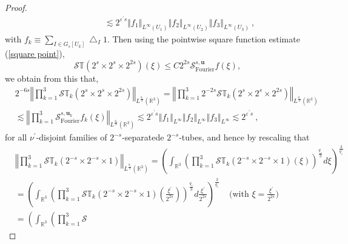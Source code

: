 \documentclass{amsart}%
\theoremstyle{plain}
\numberwithin{equation}{section}
\begin{document}
\begin{proof}
\begin{align*}
&  \ \ \ \ \ \ \ \ \ \ \ \ \ \ \ \ \ \ \ \ \lesssim2^{\varepsilon^{\prime}%
s}\left\Vert f_{1}\right\Vert _{L^{\infty}\left(  U_{1}\right)  }\left\Vert
f_{2}\right\Vert _{L^{\infty}\left(  U_{2}\right)  }\left\Vert f_{3}%
\right\Vert _{L^{\infty}\left(  U_{3}\right)  }\ ,
\end{align*}
with $f_{k}\equiv\sum_{I\in G_{s}\left[  U_{k}\right]  }\bigtriangleup_{I}1$.
Then using the pointwise square function estimate (\ref{square point}),
\[
\mathcal{S}\mathbb{T}\left(  2^{s}\times2^{s}\times2^{2s}\right)  \left(
\xi\right)  \leq C2^{2s}\mathcal{S}_{\operatorname*{Fourier}}^{s,\mathbf{u}%
}f\left(  \xi\right)  ,
\]
we obtain from this that,%
\begin{align*}
&  2^{-6s}\left\Vert \prod_{k=1}^{3}\mathcal{S}\mathbb{T}_{k}\left(
2^{s}\times2^{s}\times2^{2s}\right)  \right\Vert _{L^{\frac{q_{\varepsilon}%
}{3}}\left(  \mathbb{R}^{3}\right)  }=\left\Vert \prod_{k=1}^{3}%
2^{-2s}\mathcal{S}\mathbb{T}_{k}\left(  2^{s}\times2^{s}\times2^{2s}\right)
\right\Vert _{L^{\frac{q_{\varepsilon}}{3}}\left(  \mathbb{R}^{3}\right)  }\\
&  \lesssim\left\Vert \prod_{k=1}^{3}\mathcal{S}_{\operatorname*{Fourier}%
}^{s,\mathbf{u}_{k}}f_{k}\left(  \xi\right)  \right\Vert _{L^{\frac{q_{3}}{3}%
}\left(  \mathbb{R}^{3}\right)  }\lesssim2^{\varepsilon^{\prime}s}\left\Vert
f_{1}\right\Vert _{L^{\infty}}\left\Vert f_{2}\right\Vert _{L^{\infty}%
}\left\Vert f_{3}\right\Vert _{L^{\infty}}\lesssim2^{\varepsilon^{\prime}s}\ ,
\end{align*}
for all $\nu^{\prime}$-disjoint families of $2^{-s}$-separatede $2^{-s}%
$-tubes, and hence by rescaling that%
\begin{align*}
&  \left\Vert \prod_{k=1}^{3}\mathcal{S}\mathbb{T}_{k}\left(  2^{-s}%
\times2^{-s}\times1\right)  \right\Vert _{L^{\frac{q_{\varepsilon}}{3}}\left(
\mathbb{R}^{3}\right)  }=\left(  \int_{\mathbb{R}^{3}}\left(  \prod_{k=1}%
^{3}\mathcal{S}\mathbb{T}_{k}\left(  2^{-s}\times2^{-s}\times1\right)  \left(
\xi\right)  \right)  ^{\frac{q_{\varepsilon}}{3}}d\xi\right)  ^{\frac
{3}{q_{\varepsilon}}}\\
&  =\left(  \int_{\mathbb{R}^{3}}\left(  \prod_{k=1}^{3}\mathcal{S}%
\mathbb{T}_{k}\left(  2^{-s}\times2^{-s}\times1\right)  \left(  \frac
{\xi^{\prime}}{2^{2s}}\right)  \right)  ^{\frac{q_{\varepsilon}}{3}}d\frac
{\xi^{\prime}}{2^{2s}}\right)  ^{\frac{3}{q_{\varepsilon}}}%
\ \ \ \ \ \text{(with }\xi=\frac{\xi^{\prime}}{2^{2s}}\text{)}\\
&  =\left(  \int_{\mathbb{R}^{3}}\left(  \prod_{k=1}^{3}\mathcal{S}%

\end{align*}
\end{proof}
\end{document}
